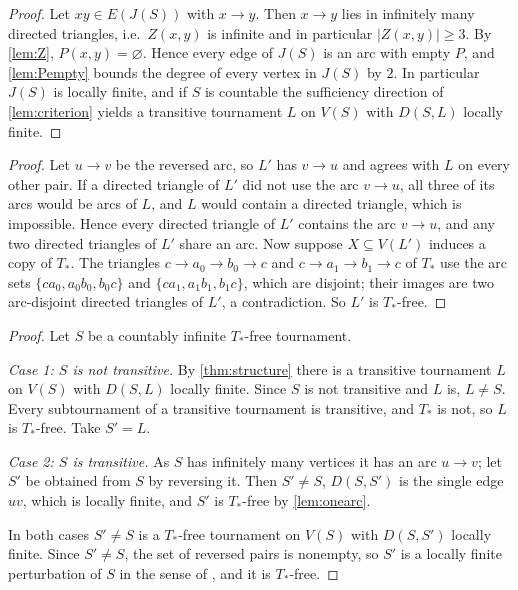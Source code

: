 \documentclass[11pt,a4paper]{article}
\theoremstyle{plain}
\theoremstyle{definition}
\theoremstyle{remark}
\newcommand{\Tstar}{T_{\ast}}
\begin{document}
\label{pf:structure}
\thmstructure*
\begin{proof}
Let $xy\in E(J(S))$ with $x\to y$. Then $x\to y$ lies in infinitely many directed triangles, i.e.\ $Z(x,y)$ is infinite and in particular $|Z(x,y)|\ge 3$. By \cref{lem:Z}, $P(x,y)=\varnothing$. Hence every edge of $J(S)$ is an arc with empty $P$, and \cref{lem:Pempty} bounds the degree of every vertex in $J(S)$ by $2$. In particular $J(S)$ is locally finite, and if $S$ is countable the sufficiency direction of \cref{lem:criterion} yields a transitive tournament $L$ on $V(S)$ with $D(S,L)$ locally finite.
\end{proof}

\label{pf:onearc}
\lemonearc*
\begin{proof}
Let $u\to v$ be the reversed arc, so $L'$ has $v\to u$ and agrees with $L$ on every other pair. If a directed triangle of $L'$ did not use the arc $v\to u$, all three of its arcs would be arcs of $L$, and $L$ would contain a directed triangle, which is impossible. Hence every directed triangle of $L'$ contains the arc $v\to u$, and any two directed triangles of $L'$ share an arc. Now suppose $X\subseteq V(L')$ induces a copy of $\Tstar$. The triangles $c\to a_0\to b_0\to c$ and $c\to a_1\to b_1\to c$ of $\Tstar$ use the arc sets $\{ca_0,a_0b_0,b_0c\}$ and $\{ca_1,a_1b_1,b_1c\}$, which are disjoint; their images are two arc-disjoint directed triangles of $L'$, a contradiction. So $L'$ is $\Tstar$-free.
\end{proof}

\label{pf:main}
\thmmain*
\begin{proof}
Let $S$ be a countably infinite $\Tstar$-free tournament.

\emph{Case 1: $S$ is not transitive.} By \cref{thm:structure} there is a transitive tournament $L$ on $V(S)$ with $D(S,L)$ locally finite. Since $S$ is not transitive and $L$ is, $L\ne S$. Every subtournament of a transitive tournament is transitive, and $\Tstar$ is not, so $L$ is $\Tstar$-free. Take $S'=L$.

\emph{Case 2: $S$ is transitive.} As $S$ has infinitely many vertices it has an arc $u\to v$; let $S'$ be obtained from $S$ by reversing it. Then $S'\ne S$, $D(S,S')$ is the single edge $uv$, which is locally finite, and $S'$ is $\Tstar$-free by \cref{lem:onearc}.

In both cases $S'\ne S$ is a $\Tstar$-free tournament on $V(S)$ with $D(S,S')$ locally finite. Since $S'\ne S$, the set of reversed pairs is nonempty, so $S'$ is a locally finite perturbation of $S$ in the sense of \cite{BGJMS25}, and it is $\Tstar$-free.
\end{proof}
\end{document}
